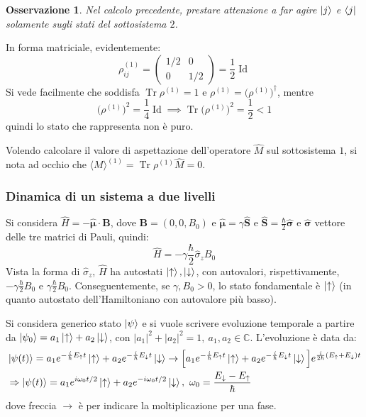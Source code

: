 \documentclass[11pt, a4paper]{scrartcl} %
\numberwithin{equation}{subsection}
\theoremstyle{style2}
\newtheorem{osservazione}{Osservazione}[section]
\theoremstyle{style1}
\begin{document}
\begin{osservazione}
	Nel calcolo precedente, prestare attenzione a far agire $\ket{j} $ e $\bra{j} $ solamente sugli stati del sottosistema $2$.
\end{osservazione}
In forma matriciale, evidentemente:
\[
	\rho ^{(1)} _{ij} = \begin{pmatrix} 1 / 2  & 0 \\  0 & 1 / 2 \end{pmatrix} = \frac{1}{2} \operatorname{Id} 
\] 
Si vede facilmente che soddisfa $\operatorname{Tr} \rho ^{(1)} = 1 $ e $\rho ^{(1)} = \big(\rho ^{(1)} \big)^\dagger $, mentre 
\[
\big(\rho ^{(1)} \big)^2   = \frac{1}{4} \operatorname{Id}  \implies \operatorname{Tr} \big(\rho ^{(1)} \big)^2 = \frac{1}{2}<1
\] 
quindi lo stato che rappresenta non \`e puro.

Volendo calcolare il valore di aspettazione dell'operatore $\hat{M}$ sul sottosistema $1$, si nota ad occhio che $\langle M \rangle^{(1)}=\operatorname{Tr} \rho ^{(1)} \hat{M}= 0$.





\subsubsection{Dinamica di un sistema a due livelli}

Si considera $\hat{H} = - \hat{\pmb{\mu } }\cdot \mathbf{B} $, dove $\mathbf{B} = (0,0,B_0)$ e $\hat{\pmb{\mu} }= \gamma \hat{\mathbf{S}} $ e $\hat{\mathbf{S}}  = \frac{\hbar }{2} \hat{\pmb{\sigma } }$ e $\hat{\pmb{\sigma }} $ vettore delle tre matrici di Pauli, quindi:
\begin{equation}
	\hat{H} = - \gamma \frac{\hbar}{2} \hat{\sigma}_z B_0 
\end{equation}
Vista la forma di $\hat{\sigma}_z$, $\hat{H}$ ha autostati $\ket{\uparrow} , \ket{\downarrow} $, con autovalori, rispettivamente, $-\gamma \frac{\hbar }{2}B_0$ e $\gamma \frac{\hbar }{2} B_0$.
Conseguentemente, se $\gamma, B_0 >0$, lo stato fondamentale \`e $\ket{\uparrow} $ (in quanto autostato dell'Hamiltoniano con autovalore pi\`u basso).

Si considera generico stato $\ket{\psi } $ e si vuole scrivere evoluzione temporale a partire da $\ket{\psi _0}  = a_{1} \ket{\uparrow} + a_2 \ket{\downarrow} $, con $\lvert a_1 \rvert ^2 + \lvert a_2 \rvert ^2 = 1, \ a_1,a_2 \in \mathbb{C}$. L'evoluzione \`e data da:
\begin{equation}
	\begin{split}
		&\ket{\psi (t)} = a_1 e^{ - \frac{i}{\hbar }E_\uparrow   t} \ket{\uparrow}  + a_2 e^{ - \frac{i}{\hbar } E_\downarrow t} \ket{\downarrow} \to \Big[a_1 e^{ - \frac{i}{\hbar }E_\uparrow   t} \ket{\uparrow}  + a_2 e^{ - \frac{i}{\hbar } E_\downarrow t} \ket{\downarrow}\Big] e^{ \frac{i}{2\hbar } (E_\uparrow+E_\downarrow) t} \\
		&\Rightarrow \ket{\psi (t)} = a_1 e^{i\omega_0 t / 2} \ket{\uparrow} + a_2 e^{ - i \omega_0 t / 2} \ket{\downarrow} , \ \omega_0 = \frac{E_\downarrow- E_\uparrow}{\hbar }
	\end{split}
\end{equation}
dove freccia $\to$ \`e per indicare la moltiplicazione per una fase.
\end{document}

